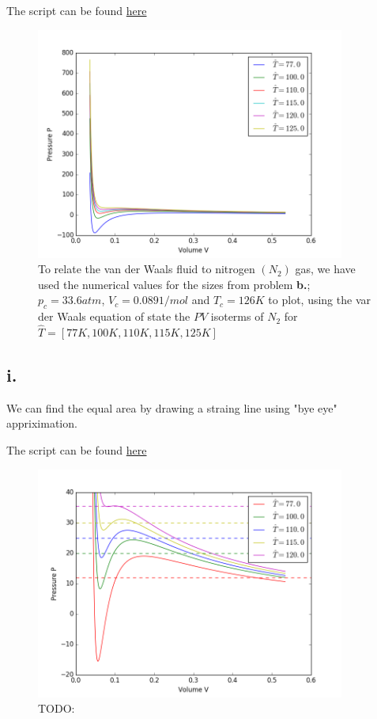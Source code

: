 \documentclass{article}
\begin{document}
The script can be found \hyperlink{code_problem_h}{here}

\begin{figure}[H]
    \centering
    \includegraphics[width=4in]{project_1/problem_h}
    \caption[Plot from problem h.]
    {To relate the van der Waals fluid to nitrogen $(N_2)$ gas, we have used the numerical values for the sizes from problem \textbf{b.}; $p_c = 33.6 atm$, $V_c = 0.089 1/mol$ and $T_c = 126 K$ to plot, using the var der Waals equation of state the $PV$ isoterms of $N_2$ for $\hat{T} = [77K, 100K, 110K, 115K, 125K]$}
\end{figure}


\subsection*{i.}

We can find the equal area by drawing a straing line using "bye eye" appriximation. 

The script can be found \hyperlink{code_problem_i}{here}

\begin{figure}[H]
    \centering
    \includegraphics[width=4in]{project_1/problem_i}
    \caption[Plot from problem h.]
    {TODO:}
\end{figure}
\end{document}
